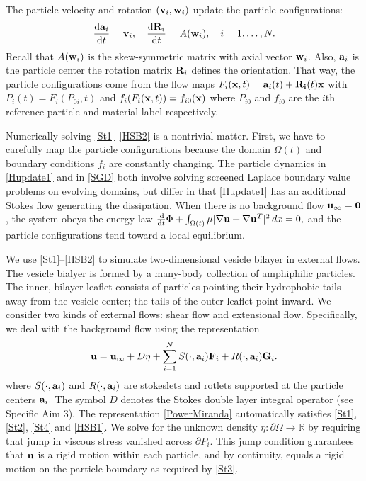 The particle velocity and rotation $({\bf v}_i, {\bf w}_i)$ update the particle configurations:
\begin{alignat}{3}
\label{Hupdate1}   \frac{\dif {\bf a}_i}{\dif t} = {\bf v}_i,      \quad  \frac{\dif {\bf R}_i}{\dif t}  = A({\bf w}_i),\quad i = 1, \dots, N.
\end{alignat}
Recall that $A({\bf w}_i)$ is the skew-symmetric matrix with axial vector ${\bf w}_i$.
Also, ${\bf a}_i$ is the particle center the rotation matrix ${\bf R}_i$ defines the orientation.
That way, the particle configurations come from the flow maps $F_i({\bf x},t) = {\bf a}_i(t) + {\bf R_i}(t){\bf x}$ with
$P_i(t) = F_i(P_{0i},t)$ and $f_i(F_i({\bf x},t)) = f_{i0}({\bf x})$ where $P_{i0}$ and $f_{i0}$ are the $i$th reference particle
and material label respectively.

Numerically solving \eqref{St1}--\eqref{HSB2} is a nontrivial matter.
First, we have to carefully map the particle configurations because the domain $\Omega(t)$ and boundary conditions $f_i$ are constantly changing.
The particle dynamics in \eqref{Hupdate1} and in \eqref{SGD} both involve solving
screened Laplace boundary value problems on evolving domains, but differ in that \eqref{Hupdate1} has an additional Stokes flow
generating the dissipation. When there is no background flow ${\bf u}_{\infty} = {\bf 0}$, the system obeys the energy law
$\frac{\dif}{\dif t} \Phi + \int_{\Omega(t)} \mu |\nabla {\bf u} + \nabla {\bf u}^T|^2 \,dx = 0,$ 
and the particle configurations tend toward a local equilibrium.

We use \eqref{St1}--\eqref{HSB2} to simulate two-dimensional vesicle bilayer in external flows. 
The vesicle bialyer is formed by a many-body  collection of amphiphilic particles. The inner, bilayer leaflet consists
of particles pointing their hydrophobic tails away from the vesicle center; the tails of the outer leaflet point inward.
We consider two kinds of external flows: shear flow and extensional flow. 
Specifically, we deal with the background flow using the representation 
\begin{equation}
\label{PowerMiranda}
{\bf u} = {\bf u}_{\infty} + D\eta + \sum_{i=1}^N S(\cdot, {\bf a}_i) {\bf F}_i + R(\cdot, {\bf a}_i) {\bf G}_i.
\end{equation}
where $S(\cdot, {\bf a}_i)$ and $ R(\cdot, {\bf a}_i)$ are stokeslets and rotlets supported at the particle centers ${\bf a}_i.$
The symbol $D$ denotes the Stokes double layer integral operator (see Specific Aim 3).   
The representation \eqref{PowerMiranda} automatically satisfies \eqref{St1}, \eqref{St2}, \eqref{St4} and \eqref{HSB1}.
We solve for the unknown density $\eta : \partial \Omega \to \mathbb{R}$ by requiring that jump in viscous stress
vanished across $\partial P_i$. This jump condition guarantees that ${\bf u}$ is a rigid motion within each particle,
and by continuity, equals a rigid motion on the particle boundary as required by \eqref{St3}.

